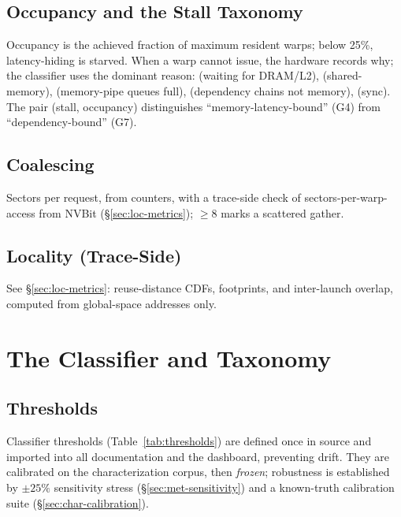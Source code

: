 \subsection{Occupancy and the Stall Taxonomy}
Occupancy is the achieved fraction of maximum resident warps; below 25\%, latency-hiding is starved. When a warp cannot issue, the hardware records why; the classifier uses the dominant reason:  (waiting for DRAM/L2),  (shared-memory),  (memory-pipe queues full),  (dependency chains not memory),  (sync). The pair (stall, occupancy) distinguishes ``memory-latency-bound'' (G4) from ``dependency-bound'' (G7).

\subsection{Coalescing}
Sectors per request, from counters, with a trace-side check of sectors-per-warp-access from NVBit (\S\ref{sec:loc-metrics}); $\geq 8$ marks a scattered gather.

\subsection{Locality (Trace-Side)}
See \S\ref{sec:loc-metrics}: reuse-distance CDFs, footprints, and inter-launch overlap, computed from global-space addresses only.

\section{The Classifier and Taxonomy}
\label{sec:met-tree}

\subsection{Thresholds}
Classifier thresholds (Table~\ref{tab:thresholds}) are defined once in source and imported into all documentation and the dashboard, preventing drift. They are calibrated on the characterization corpus, then \emph{frozen}; robustness is established by $\pm 25\%$ sensitivity stress (\S\ref{sec:met-sensitivity}) and a known-truth calibration suite (\S\ref{sec:char-calibration}).

